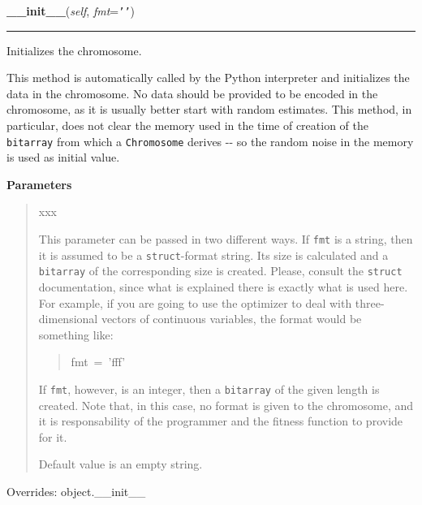     \begin{boxedminipage}{\textwidth}

    \raggedright \textbf{\_\_init\_\_}(\textit{self}, \textit{fmt}=\texttt{\texttt{'}\texttt{}\texttt{'}})

    \vspace{-1.5ex}

    \rule{\textwidth}{0.5\fboxrule}

Initializes the chromosome.

This method is automatically called by the Python interpreter and
initializes the data in the chromosome. No data should be provided to be
encoded in the chromosome, as it is usually better start with random
estimates. This method, in particular, does not clear the memory used in
the time of creation of the \texttt{bitarray} from which a \texttt{Chromosome}
derives -{}- so the random noise in the memory is used as initial value.
    \vspace{1ex}

      \textbf{Parameters}
      \begin{quote}
        \begin{Ventry}{xxx}

          \item[fmt]


This parameter can be passed in two different ways. If \texttt{fmt} is a
string, then it is assumed to be a \texttt{struct}-format string. Its
size is calculated and a \texttt{bitarray} of the corresponding size is
created. Please, consult the \texttt{struct} documentation, since what is
explained there is exactly what is used here. For example, if you
are going to use the optimizer to deal with three-dimensional
vectors of continuous variables, the format would be something
like:
\begin{quote}{\ttfamily \raggedright \noindent
fmt~=~'fff'
}\end{quote}

If \texttt{fmt}, however, is an integer, then a \texttt{bitarray} of the given
length is created. Note that, in this case, no format is given to
the chromosome, and it is responsability of the programmer and the
fitness function to provide for it.

Default value is an empty string.
        \end{Ventry}

      \end{quote}

    \vspace{1ex}

      Overrides: object.\_\_init\_\_

    \end{boxedminipage}

